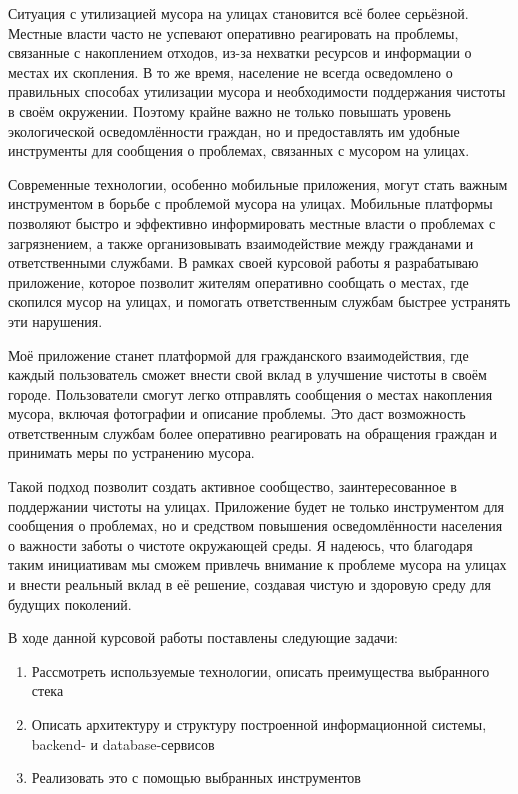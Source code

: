 \documentclass[coursework]{SCWorks}
\begin{document}
Ситуация с утилизацией мусора на улицах становится всё более серьёзной. 
Местные власти часто не успевают оперативно реагировать на проблемы, связанные 
с накоплением отходов, из-за нехватки ресурсов и информации о местах их 
скопления. В то же время, население не всегда осведомлено о правильных 
способах утилизации мусора и необходимости поддержания чистоты в своём 
окружении. Поэтому крайне важно не только повышать уровень экологической 
осведомлённости граждан, но и предоставлять им удобные инструменты для 
сообщения о проблемах, связанных с мусором на улицах.

Современные технологии, особенно мобильные приложения, могут стать важным 
инструментом в борьбе с проблемой мусора на улицах. Мобильные платформы 
позволяют быстро и эффективно информировать местные власти о проблемах с 
загрязнением, а также организовывать взаимодействие между гражданами и 
ответственными службами. В рамках своей курсовой работы я разрабатываю 
приложение, которое позволит жителям оперативно сообщать о местах, где 
скопился мусор на улицах, и помогать ответственным службам быстрее устранять 
эти нарушения.

Моё приложение станет платформой для гражданского взаимодействия, где каждый 
пользователь сможет внести свой вклад в улучшение чистоты в своём городе. 
Пользователи смогут легко отправлять сообщения о местах накопления мусора, 
включая фотографии и описание проблемы. Это даст возможность ответственным 
службам более оперативно реагировать на обращения граждан и принимать меры по 
устранению мусора.

Такой подход позволит создать активное сообщество, заинтересованное в 
поддержании чистоты на улицах. Приложение будет не только инструментом для 
сообщения о проблемах, но и средством повышения осведомлённости населения о 
важности заботы о чистоте окружающей среды. Я надеюсь, что благодаря таким 
инициативам мы сможем привлечь внимание к проблеме мусора на улицах и внести 
реальный вклад в её решение, создавая чистую и здоровую среду для будущих 
поколений.

В ходе данной курсовой работы поставлены следующие задачи:
\begin{enumerate}
    \item Рассмотреть используемые технологии, описать преимущества выбранного 
    стека
    \item Описать архитектуру и структуру построенной информационной системы, 
    backend- и database-сервисов
    \item Реализовать это с помощью выбранных инструментов
\end{enumerate}
\end{document}
